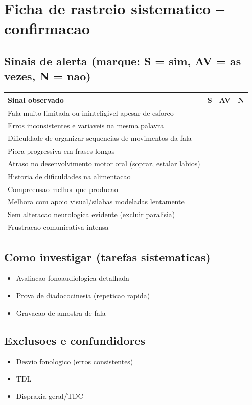 \documentclass[a4paper,11pt]{book}
\begin{document}
\section*{Ficha de rastreio sistematico -- confirmacao}
\subsection*{Sinais de alerta (marque: S = sim, AV = as vezes, N = nao)}
\begin{tabular}{@{}p{11.5cm}ccc@{}}\toprule
Sinal observado & S & AV & N \\\midrule
Fala muito limitada ou ininteligivel apesar de esforco & & & \\
Erros inconsistentes e variaveis na mesma palavra & & & \\
Dificuldade de organizar sequencias de movimentos da fala & & & \\
Piora progressiva em frases longas & & & \\
Atraso no desenvolvimento motor oral (soprar, estalar labios) & & & \\
Historia de dificuldades na alimentacao & & & \\
Compreensao melhor que producao & & & \\
Melhora com apoio visual/silabas modeladas lentamente & & & \\
Sem alteracao neurologica evidente (excluir paralisia) & & & \\
Frustracao comunicativa intensa & & & \\
\bottomrule\end{tabular}
\subsection*{Como investigar (tarefas sistematicas)}
\begin{itemize}
\item Avaliacao fonoaudiologica detalhada
\item Prova de diadococinesia (repeticao rapida)
\item Gravacao de amostra de fala
\end{itemize}
\subsection*{Exclusoes e confundidores}
\begin{itemize}
\item Desvio fonologico (erros consistentes)
\item TDL
\item Dispraxia geral/TDC
\end{itemize}
\end{document}
